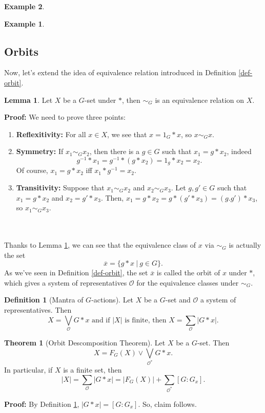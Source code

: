 \documentclass[11pt]{amsbook}%
\newcommand{\ii}{\item}
\theoremstyle{plain}
\theoremstyle{definition}
\newtheorem{definition*}{Definition}
\newtheorem*{example*}{Example}
\newtheorem{lemma}{Lemma}
\newtheorem{theorem}{Theorem}
\numberwithin{equation}{section}
\newcommand{\OC}{\mathcal O}
\renewcommand{\proof}{ \textbf{Proof: }}
\begin{document}
\begin{example*}
\begin{example*}
\subsection{Orbits}
Now, let's extend the idea of equivalence relation introduced in Definition \ref{def-orbit}.
\begin{lemma}
  \label{lemm-equiv-relation}
  Let $X$ be a $G$-set under $*$, then $\sim_{G}$ is an equivalence relation on $X$.
\end{lemma} \vspace{1.8em}
\proof We need to prove three points:
\begin{enumerate}[1. ] 
    \ii \textbf{Reflexitivity: }For all $x \in X$, we see that $x = 1_{G}*x$, so $x \sim_{G} x$.
    \ii \textbf{Symmetry: }If $x_{1} \sim_{G} x_{2}$, then there is a $g \in G$ such that $x_{1} = g*x_{2}$,
    indeed
    $$
    g^{-1}*x_{1} = g^{-1}*(g*x_{2}) = 1_{g}*x_{2} = x_{2}.
    $$
    Of course, $x_{1} = g*x_{2}$ iff $x_{1}*g^{-1} = x_{2}$.
    \ii \textbf{Transitivity: }Suppose that $x_{1} \sim_{G} x_{2}$ and $x_{2} \sim_{G} x_{3}$.
    Let $g, g' \in G$ such that $x_{1} = g*x_{2}$ and $x_{2} = g'*x_{3}$.
    Then, $x_{1} = g*x_{2} = g*(g'*x_{3}) = (g.g')*x_{3}$, so $x_{1} \sim_{G} x_{3}$.
\end{enumerate}
\qedsymbol \\ \\
Thanks to Lemma \ref{lemm-equiv-relation}, we can see that the equivalence class of $x$ via $\sim_{G}$
is actually the set
$$
\overline{x} = \{g*x \ | \ g \in G\}.
$$
As we've seen in Definition \ref{def-orbit}, the set $\overline{x}$ is called the orbit of $x$ under $*$,
which gives a system of representatives $\OC$ for the equivalence classes under $\sim_{G}$. 

\begin{definition*}[Mantra of $G$-actions]
  \label{def-mantra-g-actions}
  Let $X$ be a $G$-set and $\OC$ a system of representatives. Then
  $$
  X = \bigvee_{\OC} G*x \text{ and if } |X| \text{ is finite, then } X = \sum_{\OC} |G*x|.
  $$
\end{definition*}

\begin{theorem}[Orbit Descomposition Theorem]
  \label{theo-orbit}
  Let $X$ be a $G$-set. Then
  $$
  X = F_{G}(X) \vee \bigvee_{\OC^{*}} G*x.
  $$
  In particular, if $X$ is a finite set, then
  $$
  |X| = \sum\limits_{\OC} |G*x| = |F_{G}(X)| + \sum\limits_{\OC^{*}} [G:G_{x}].
  $$
\end{theorem} \vspace{1.8em}
\proof By Definition \ref{def-mantra-g-actions}, $|G*x| = [G:G_{x}]$. So, claim follows. \qedsymbol


\end{example*}
\end{example*}
\end{document}
